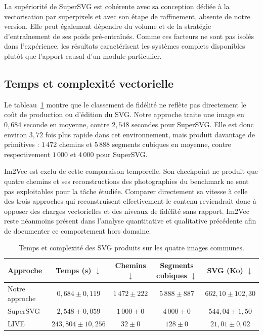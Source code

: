 \documentclass[12pt, a4paper, oneside]{report}
\begin{document}
La supériorité de SuperSVG est cohérente avec sa conception dédiée à la vectorisation par superpixels et avec son étape de raffinement, absente de notre version. Elle peut également dépendre du volume et de la stratégie d'entraînement de ses poids pré-entraînés. Comme ces facteurs ne sont pas isolés dans l'expérience, les résultats caractérisent les systèmes complets disponibles plutôt que l'apport causal d'un module particulier.

\subsection{Temps et complexité vectorielle}

Le tableau~\ref{tab:comparaison_methodes_complexite} montre que le classement de fidélité ne reflète pas directement le coût de production ou d'édition du SVG. Notre approche traite une image en $0{,}684$ seconde en moyenne, contre $2{,}548$ secondes pour SuperSVG. Elle est donc environ $3{,}72$ fois plus rapide dans cet environnement, mais produit davantage de primitives : $1\,472$ chemins et $5\,888$ segments cubiques en moyenne, contre respectivement $1\,000$ et $4\,000$ pour SuperSVG.

Im2Vec est exclu de cette comparaison temporelle. Son checkpoint ne produit que quatre chemins et ses reconstructions des photographies du benchmark ne sont pas exploitables pour la tâche étudiée. Comparer directement sa vitesse à celle des trois approches qui reconstruisent effectivement le contenu reviendrait donc à opposer des charges vectorielles et des niveaux de fidélité sans rapport. Im2Vec reste néanmoins présent dans l'analyse quantitative et qualitative précédente afin de documenter ce comportement hors domaine.

\begin{table}[H]
    \centering
    \footnotesize
    \caption{Temps et complexité des SVG produits sur les quatre images communes.}
    \label{tab:comparaison_methodes_complexite}
    \begin{tabular}{lcccc}
        \toprule
        \textbf{Approche} & \textbf{Temps (s) $\downarrow$} & \textbf{Chemins $\downarrow$} & \textbf{Segments cubiques $\downarrow$} & \textbf{SVG (Ko) $\downarrow$} \\
        \midrule
        Notre approche & $0{,}684 \pm 0{,}119$ & $1\,472 \pm 222$ & $5\,888 \pm 887$ & $662{,}10 \pm 102{,}30$ \\
        SuperSVG & $2{,}548 \pm 0{,}059$ & $1\,000 \pm 0$ & $4\,000 \pm 0$ & $544{,}04 \pm 1{,}50$ \\
        LIVE & $243{,}804 \pm 10{,}256$ & $32 \pm 0$ & $128 \pm 0$ & $21{,}01 \pm 0{,}02$ \\
        \bottomrule
    \end{tabular}
\end{table}
\end{document}

